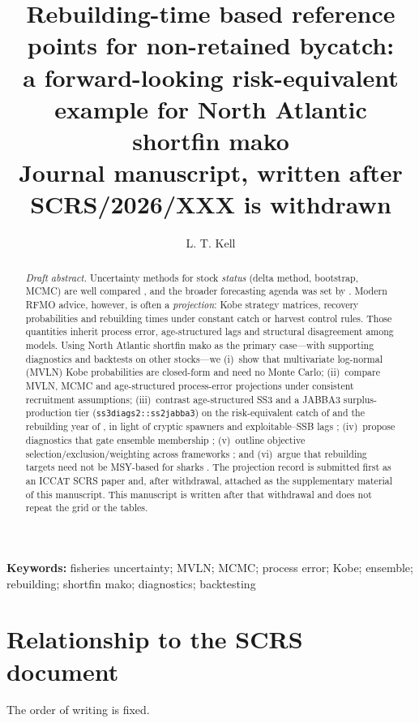 \documentclass[11pt,a4paper]{article}
\title{\textbf{Rebuilding-time based reference points for non-retained bycatch:\\
a forward-looking risk-equivalent example for North Atlantic shortfin mako}\\[0.5em]
\large Journal manuscript, written after SCRS/2026/XXX is withdrawn}
\author[1]{L. T. Kell}
\affil[1]{Centre for Environmental Policy, Imperial College London, United Kingdom}
\date{}
\begin{document}
\maketitle

\begin{abstract}
\noindent\textit{Draft abstract.}
Uncertainty methods for stock \emph{status} (delta method, bootstrap, MCMC)
are well compared \citep{Magnusson2013}, and the broader forecasting agenda
was set by \citet{Patterson2001}. Modern RFMO advice, however, is often a
\emph{projection}: Kobe strategy matrices, recovery probabilities and
rebuilding times under constant catch or harvest control rules. Those
quantities inherit process error, age-structured lags and structural
disagreement among models. Using North Atlantic shortfin mako as the primary
case---with supporting diagnostics and backtests on other stocks---we (i)~show
that multivariate log-normal (MVLN) Kobe probabilities are closed-form and need
no Monte Carlo; (ii)~compare MVLN, MCMC and age-structured process-error
projections under consistent recruitment assumptions; (iii)~contrast
age-structured SS3 and a JABBA3 surplus-production tier
(\texttt{ss3diags2::ss2jabba3}) on the risk-equivalent catch of
\citet{Fischer2023} and the rebuilding year of \citet{KellAcceptedFaF}, in
light of cryptic spawners and exploitable--SSB lags \citep{Winker2020SMA};
(iv)~propose diagnostics that
gate ensemble membership \citep{Kell2026Diags,Carvalho2021}; (v)~outline
objective selection/exclusion/weighting across frameworks
\citep{WangEnsembleR5}; and (vi)~argue that rebuilding targets need not be
MSY-based for sharks \citep{KellAcceptedFaF}. The projection record is
submitted first as an ICCAT SCRS paper and, after withdrawal, attached as
the supplementary material of this manuscript. This manuscript is written
after that withdrawal and does not repeat the grid or the tables.
\end{abstract}

\textbf{Keywords:} fisheries uncertainty; MVLN; MCMC; process error; Kobe;
ensemble; rebuilding; shortfin mako; diagnostics; backtesting

\section{Relationship to the SCRS document}

The order of writing is fixed.
\end{document}
